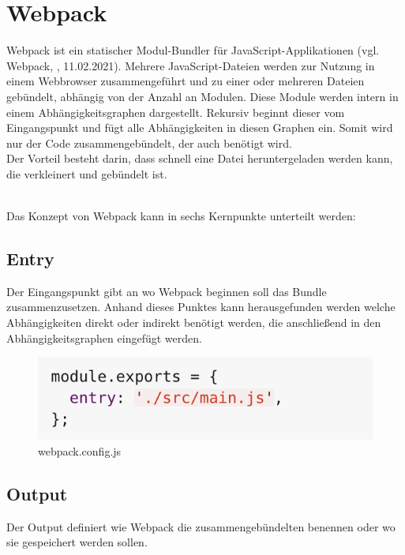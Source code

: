 \section{Webpack}
Webpack ist ein statischer Modul-Bundler für JavaScript-Applikationen (vgl. Webpack, \cite{webpack_2021}, 11.02.2021). Mehrere JavaScript-Dateien werden zur Nutzung in einem Webbrowser zusammengeführt und zu einer oder mehreren Dateien gebündelt, abhängig von der Anzahl an Modulen. Diese Module werden intern in einem Abhängigkeitsgraphen dargestellt. Rekursiv beginnt dieser vom Eingangspunkt und fügt alle Abhängigkeiten in diesen Graphen ein. Somit wird nur der Code zusammengebündelt, der auch benötigt wird. \\
Der Vorteil besteht darin, dass schnell eine Datei heruntergeladen werden kann, die verkleinert und gebündelt ist. 

\mbox{}\\
Das Konzept von Webpack kann in sechs Kernpunkte unterteilt werden:

\subsection{Entry}
Der Eingangspunkt gibt an wo Webpack beginnen soll das Bundle zusammenzusetzen. Anhand dieses Punktes kann herausgefunden werden welche Abhängigkeiten direkt oder indirekt benötigt werden, die anschließend in den Abhängigkeitsgraphen eingefügt werden. 

\begin{figure}[H]
	\begin{center}
		\includegraphics[scale=.7]{images/webpack-entry-point.png}
	\end{center}
		\caption{webpack.config.js}
\end{figure}

\subsection{Output}
Der Output definiert wie Webpack die zusammengebündelten benennen oder wo sie gespeichert werden sollen. 

